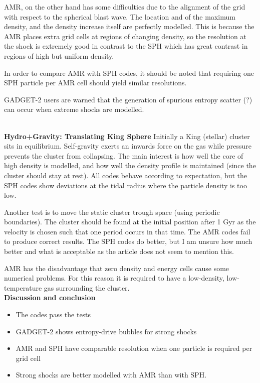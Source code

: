 \documentclass[MScProj_TLRH_ClusterEnergy.tex]{subfiles}
\begin{document}
AMR, on the other hand has some difficulties due to the alignment of the grid with respect to the spherical blast wave. The location and of the maximum density, and the density increase itself are perfectly modelled. This is because the AMR places extra grid cells at regions of changing density, so the resolution at the shock is extremely good in contrast to the SPH which has great contrast in regions of high but uniform density.

In order to compare AMR with SPH codes, it should be noted that requiring one SPH particle per AMR cell should yield similar resolutions.

GADGET-2 users are warned that the generation of spurious entropy scatter (?) can occur when extreme shocks are modelled.

\\
\textbf{Hydro+Gravity: Translating King Sphere}
Initially a King (stellar) cluster sits in equilibrium. Self-gravity exerts an inwards force on the gas while pressure prevents the cluster from collapsing. The main interest is how well the core of high density is modelled, and how well the density profile is maintained (since the cluster should stay at rest). All codes behave according to expectation, but the SPH codes show deviations at the tidal radius where the particle density is too low.

Another test is to move the static cluster trough space (using periodic boundaries). The cluster should be found at the initial position after 1 Gyr as the velocity is chosen such that one period occurs in that time. The AMR codes fail to produce correct results. The SPH codes do better, but I am unsure how much better and what is acceptable as the article does not seem to mention this.

AMR has the disadvantage that zero density and energy cells cause some numerical problems. For this reason it is required to have a low-density, low-temperature gas surrounding the cluster.
\\
\textbf{Discussion and conclusion}
\begin{itemize}
    \item The codes pass the tests
    \item GADGET-2 shows entropy-drive bubbles for strong shocks
    \item AMR and SPH have comparable resolution when one particle is required per grid cell
    \item Strong shocks are better modelled with AMR than with SPH.
\end{itemize}


\SubfileBibliography
\end{document}
